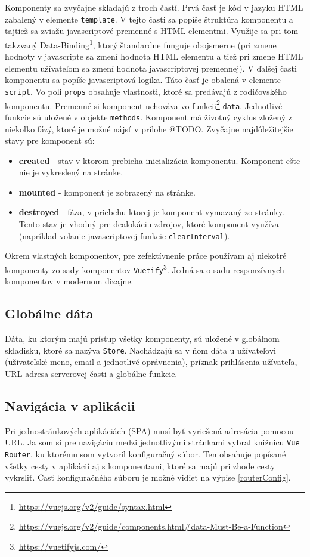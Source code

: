 \documentclass[slovak]{fitthesis}
\begin{document}
Komponenty sa zvyčajne skladajú z troch častí. Prvá časť je kód v jazyku HTML zabalený v elemente \texttt{template}. V tejto časti sa popíše štruktúra komponentu a tajtiež sa zviažu javascriptové premenné s HTML elementmi. Využije sa pri tom takzvaný Data-Binding\footnote{\url{https://vuejs.org/v2/guide/syntax.html}}, ktorý štandardne funguje obojsmerne (pri zmene hodnoty v javascripte sa zmení hodnota HTML elementu a tiež pri zmene HTML elementu užívateľom sa zmení hodnota javascriptovej premennej). V ďalšej časti komponentu sa popíše javascriptová logika. Táto časť je obalená v elemente \texttt{script}. Vo poli \texttt{props} obsahuje vlastnosti, ktoré sa predávajú z rodičovského komponentu. Premenné si komponent uchováva vo funkcii\footnote{\url{https://vuejs.org/v2/guide/components.html\#data-Must-Be-a-Function}} \texttt{data}. Jednotlivé funkcie sú uložené v objekte \texttt{methods}. Komponent má životný cyklus zložený z niekoľko fázý, ktoré je možné nájsť v prílohe @TODO. Zvyčajne najdôležitejšie stavy pre komponent sú:
\begin{itemize}
    \item \textbf{created} - stav v ktorom prebieha inicializácia komponentu. Komponent ešte nie je vykreslený na stránke.
    \item \textbf{mounted} - komponent je zobrazený na stránke.
    \item \textbf{destroyed} - fáza, v priebehu ktorej je komponent vymazaný zo stránky. Tento stav je vhodný pre dealokáciu zdrojov, ktoré komponent využíva (napríklad volanie javascriptovej funkcie \texttt{clearInterval}).
\end{itemize}


Okrem vlastných komponentov, pre zefektívnenie práce používam aj niekotré komponenty zo sady komponentov \texttt{Vuetify}\footnote{\url{https://vuetifyjs.com/}}. Jedná sa o sadu responzívnych komponentov v modernom dizajne.

\subsection{Globálne dáta}
Dáta, ku ktorým majú prístup všetky komponenty, sú uložené v globálnom skladisku, ktoré sa nazýva \texttt{Store}. Nachádzajú sa v ňom dáta u užívateľovi (uživateľské meno, email a jednotlivé oprávnenia), príznak prihlásenia užívateľa, URL adresa serverovej časti a globálne funkcie.

\subsection{Navigácia v aplikácii}
Pri jednostránkových aplikáciách (SPA) musí byť vyriešená adresácia pomocou URL. Ja som si pre navigáciu medzi jednotlivými stránkami vybral knižnicu \texttt{Vue Router}, ku ktorému som vytvoril konfiguračný súbor. Ten obsahuje popísané všetky cesty v aplikácií aj s komponentami, ktoré sa majú pri zhode cesty vykrsliť. Časť konfiguračného súboru je možné vidieť na výpise \ref{routerConfig}.
\end{document}
